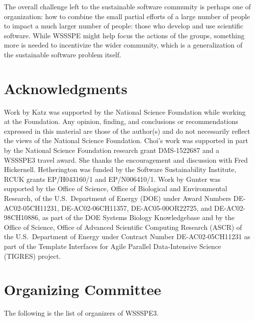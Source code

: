\documentclass[11pt, oneside]{amsart}
\newcommand{\todo}[1]{{\color{blue}$\blacksquare$~\textsf{[TODO: #1]}}}
\begin{document}
The overall challenge left to the sustainable software community is perhaps one
of organization: how to combine the small partial efforts of a large number of
people to impact a much larger number of people: those who develop and use
scientific software. While WSSSPE might help focus the actions of the groups,
something more is needed to incentivize the wider community, which is a
generalization of the sustainable software problem itself.


\section*{Acknowledgments} \label{sec:acks}

Work by Katz was supported by the National Science Foundation while working at
the Foundation. Any opinion, finding, and conclusions or recommendations
expressed in this material are those of the author(s) and do not necessarily
reflect the views of the National Science Foundation.
%
Choi's work was supported in part by the National Science Foundation research
grant DMS-1522687 and a WSSSPE3 travel award. She thanks the encouragement and
discussion with Fred Hickernell.
%
Hetherington was funded by the Software Sustainability Institute, RCUK grants
EP/H043160/1 and EP/N006410/1.
%
Work by Gunter was supported by the Office of Science, Office of Biological and
Environmental Research, of the U.S.\ Department of Energy (DOE) under Award
Numbers DE-AC02-05CH11231, DE-AC02-06CH11357, DE-AC05-00OR22725, and
DE-AC02-98CH10886, as part of the DOE Systems Biology Knowledgebase and by the
Office of Science, Office of Advanced Scientific Computing Research (ASCR) of
the U.S.\ Department of Energy under Contract Number DE-AC02-05CH11231 as part
of the Template Interfaces for Agile Parallel Data-Intensive Science (TIGRES)
project.
%

\appendix
\section{Organizing Committee}  \label{sec:orgcom}

The following is the list of organizers of WSSSPE3.

{\scriptsize
\begin{longtable}{lll}

\end{longtable}
}
 
\end{document}
